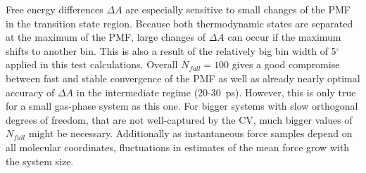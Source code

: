 Free energy differences $\Delta A$ are especially sensitive to small changes of the PMF in the transition state region. Because both thermodynamic states are separated at the maximum of the PMF, large changes of $\Delta A$ can occur if the maximum shifts to another bin.
This is also a result of the relatively big bin width of 5$^\circ$ applied in this test calculations.
Overall $N_{full}=100$ gives a good compromise between fast and stable convergence of the PMF as well as already nearly optimal accuracy of $\Delta A$ in the intermediate regime (20-30~ps).
However, this is only true for a small gas-phase system as this one.
For bigger systems with slow orthogonal degrees of freedom, that are not well-captured by the CV, much bigger values of $N_{full}$ might be necessary.\autocite{comer2015adaptive}
Additionally as instantaneous force samples depend on all molecular coordinates, fluctuations in estimates of the mean force grow with the system size.\autocite{alrachid2015long}

